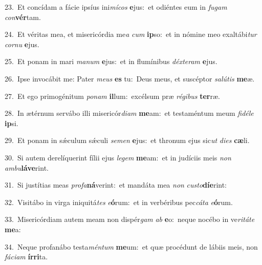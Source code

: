 {\numbfont\textcolor{\numbcolor}{23.}}~Et concídam a fácie ipsíus ini\-\textit{mí}\-\textit{cos} \textbf{e}\-jus:~\star et odiéntes eum in \textit{fu}\-\textit{gam} \textit{con}\-\textbf{vér}tam.\par
{\numbfont\textcolor{\numbcolor}{24.}}~Et véritas mea, et misericórdia me\textit{a} \textit{cum} \textbf{ip}\-so:~\star et in nómine meo exaltábi\textit{tur} \textit{cor}\-\textit{nu} \textbf{e}\-jus.\par
{\numbfont\textcolor{\numbcolor}{25.}}~Et ponam in mari \textit{ma}\-\textit{num} \textbf{e}\-jus:~\star et in flumínibus \textit{déx}\-\textit{te}\textit{ram} \textbf{e}\-jus.\par
{\numbfont\textcolor{\numbcolor}{26.}}~Ipse invocábit me: Pater \textit{me}\-\textit{us} \textbf{es} tu:~\star Deus meus, et suscéptor \textit{sa}\-\textit{lú}\textit{tis} \textbf{me}\-æ.\par
{\numbfont\textcolor{\numbcolor}{27.}}~Et ego primogénitum \textit{po}\-\textit{nam} \textbf{il}\-lum:~\star excélsum præ \textit{ré}\-\textit{gi}\textit{bus} \textbf{ter}\-ræ.\par
{\numbfont\textcolor{\numbcolor}{28.}}~In ætérnum servábo illi misericór\-\textit{di}\-\textit{am} \textbf{me}\-am:~\star et testaméntum meum \textit{fi}\-\textit{dé}\textit{le} \textbf{ip}\-si.\par
{\numbfont\textcolor{\numbcolor}{29.}}~Et ponam in sǽculum sǽculi \textit{se}\-\textit{men} \textbf{e}\-jus:~\star et thronum ejus sic\textit{ut} \textit{di}\-\textit{es} \textbf{cæ}\-li.\par
{\numbfont\textcolor{\numbcolor}{30.}}~Si autem derelíquerint fílii ejus \textit{le}\-\textit{gem} \textbf{me}\-am:~\star et in judíciis meis \textit{non} \textit{am}\-\textit{bu}\textbf{lá}\textbf{ve}rint.\par
{\numbfont\textcolor{\numbcolor}{31.}}~Si justítias meas \textit{pro}\-\textit{fa}\textbf{ná}verint:~\star et mandáta mea \textit{non} \textit{cus}\-\textit{to}\textbf{dí}\textbf{e}rint:\par
{\numbfont\textcolor{\numbcolor}{32.}}~Visitábo in virga iniquitá\textit{tes} \textit{e}\-\textbf{ó}rum:~\star et in verbéribus pec\-\textit{cá}\-\textit{ta} \textit{e}\-\textbf{ó}rum.\par
{\numbfont\textcolor{\numbcolor}{33.}}~Misericórdiam autem meam non dispér\textit{gam} \textit{ab} \textbf{e}\-o:~\star neque nocébo in ve\-\textit{ri}\-\textit{tá}\textit{te} \textbf{me}\-a:\par
{\numbfont\textcolor{\numbcolor}{34.}}~Neque profanábo testa\-\textit{mén}\-\textit{tum} \textbf{me}\-um:~\star et quæ procédunt de lábiis meis, non \textit{fá}\-\textit{ci}\textit{am} \textbf{ír}\-\textbf{ri}ta.\par
